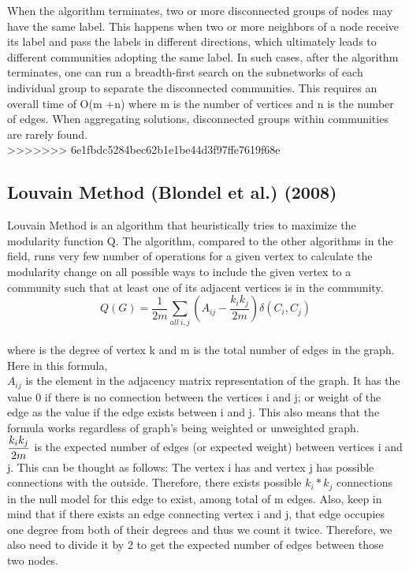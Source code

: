 \documentclass[10pt]{article}
\begin{document}
When the algorithm terminates, two or more disconnected groups of nodes may have the same label. This happens when two or more neighbors of a node receive its label and pass the labels in different directions, which ultimately leads to different communities adopting the same label. In such cases, after the algorithm terminates, one can run a breadth-first search on the subnetworks of each individual group to separate the disconnected communities. This requires an overall time of O(m +n) where m is the number of vertices and n is the number of edges. When aggregating solutions, disconnected groups within communities are rarely found. \\
>>>>>>> 6e1fbdc5284bec62b1e1be44d3f97ffe7619f68e

\subsection{Louvain Method (Blondel et al.) (2008)}

Louvain Method is an algorithm that heuristically tries to maximize the modularity function Q. The algorithm, compared to the other algorithms in the field, runs very few number of operations for a given vertex to calculate the modularity change on all possible ways to include the given vertex to a community such that at least one of its adjacent vertices is in the community. \\

\[ Q\left(G\right) = \frac{1}{2m}  \sum_{all\ i,j} \left( A_{ij} - \frac{k_i k_j}{2m} \right)  \delta \left( C_i, C_j\right) \] \\

where is the degree of vertex k and m is the total number of edges in the graph. Here in this formula, \\

$A_{ij}$ is the element in the adjacency matrix representation of the graph. It has the value 0 if there is no connection between the vertices i and j; or weight of the edge as the value if the edge exists between i and j. This also means that the formula works regardless of graph’s being weighted or unweighted graph. \\

$ \mathlarger{ \frac{k_i k_j}{2m} } $ is the expected number of edges (or expected weight) between vertices i and j. This can be thought as follows: The vertex i has and vertex j has possible connections with the outside. Therefore, there exists possible $k_i * k_j$ connections in the null model for this edge to exist, among total of m edges. Also, keep in mind that if there exists an edge connecting vertex i and j, that edge occupies one degree from both of their degrees and thus we count it twice. Therefore, we also need to divide it by 2 to get the expected number of edges between those two nodes. \\
\end{document}
